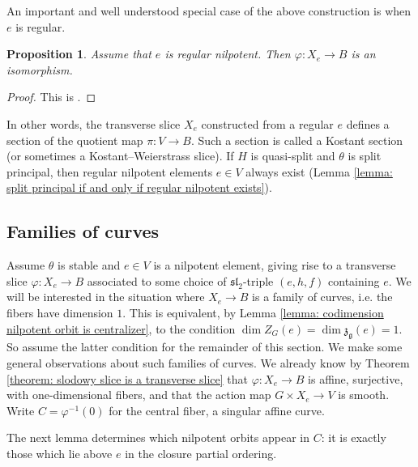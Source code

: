 \documentclass{article} %
\newtheorem{proposition}{Proposition}[section]
\numberwithin{equation}{section}
\theoremstyle{definition}
\newcommand{\frakg}{\mathfrak g}
\newcommand{\frakz}{\mathfrak z}
\newcommand{\fraksl}{\mathfrak{sl}}
\begin{document}
An important and well understood special case of the above construction is when $e$ is regular. 

\begin{proposition}\label{proposition: transverse slice regular nilpotent is isomorphism}
    Assume that $e$ is regular nilpotent. 
    Then $\varphi\colon X_e\rightarrow B$ is an isomorphism.
\end{proposition}
\begin{proof}
    This is \cite[Theorem 3.5(ii)]{Panyushev-Invarianttheorythetagroups}.
\end{proof}

In other words, the transverse slice $X_e$ constructed from a regular $e$ defines a section of the quotient map $\pi\colon V\rightarrow B$.
Such a section is called a Kostant section (or sometimes a Kostant--Weierstrass slice).
If $H$ is quasi-split and $\theta$ is split principal, then regular nilpotent elements $e\in V$ always exist (Lemma \ref{lemma: split principal if and only if regular nilpotent exists}).



\subsection{Families of curves}\label{section-families-of-curves}

Assume $\theta$ is stable and $e\in V$ is a nilpotent element, giving rise to a transverse slice $\varphi\colon X_e\rightarrow B$ associated to some choice of $\fraksl_2$-triple $(e,h,f)$ containing $e$.
We will be interested in the situation where $X_e\rightarrow B$ is a family of curves, i.e. the fibers have dimension $1$.
This is equivalent, by Lemma \ref{lemma: codimension nilpotent orbit is centralizer}, to the condition $\dim Z_G(e)=\dim\frakz_{\frakg}(e)=1$.
So assume the latter condition for the remainder of this section.
We make some general observations about such families of curves.
We already know by Theorem \ref{theorem: slodowy slice is a transverse slice} that $\varphi\colon X_e\rightarrow B$ is affine, surjective, with one-dimensional fibers, and that the action map $G\times X_e\rightarrow V$ is smooth.
Write $C = \varphi^{-1}(0)$ for the central fiber, a singular affine curve. 






The next lemma determines which nilpotent orbits appear in $C$: it is exactly those which lie above $e$ in the closure partial ordering.
\end{document}
